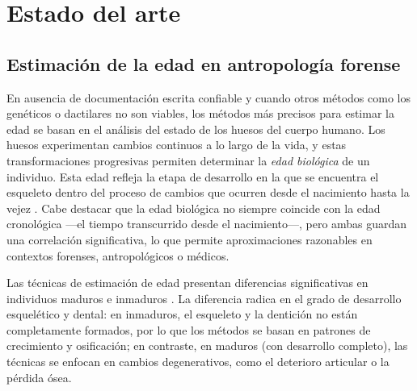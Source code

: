 \chapter{Estado del arte}


\section{Estimación de la edad en antropología forense}


En ausencia de documentación escrita confiable y cuando otros métodos como los genéticos o dactilares no son viables, los métodos más precisos para estimar la edad se basan en el análisis del estado de los huesos del cuerpo humano. Los huesos experimentan cambios continuos a lo largo de la vida, y estas transformaciones progresivas permiten determinar la \textit{edad biológica} de un individuo. Esta edad refleja la etapa de desarrollo en la que se encuentra el esqueleto dentro del proceso de cambios que ocurren desde el nacimiento hasta la vejez \cite{byers2023}. Cabe destacar que la edad biológica no siempre coincide con la edad cronológica ---el tiempo transcurrido desde el nacimiento---, pero ambas guardan una correlación significativa, lo que permite aproximaciones razonables en contextos forenses, antropológicos o médicos.

Las técnicas de estimación de edad presentan diferencias significativas en individuos maduros e inmaduros \cite{ubelaker2019}. La diferencia radica en el grado de desarrollo esquelético y dental: en inmaduros, el esqueleto y la dentición no están completamente formados, por lo que los métodos se basan en patrones de crecimiento y osificación; en contraste, en maduros (con desarrollo completo), las técnicas se enfocan en cambios degenerativos, como el deterioro articular o la pérdida ósea.

